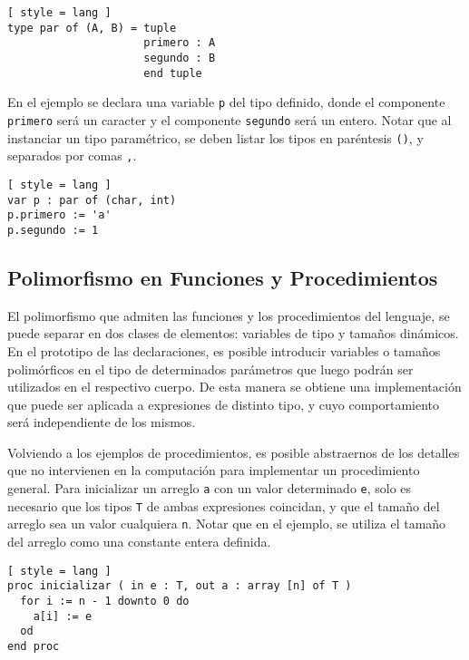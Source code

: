 \begin{lstlisting}[ style = lang ]
type par of (A, B) = tuple
                     primero : A
                     segundo : B
                     end tuple
\end{lstlisting}

En el ejemplo se declara una variable \lstinline[style = lang]{p} del tipo definido, donde el componente \lstinline[style = lang]{primero} será un caracter y el componente \lstinline[style = lang]{segundo} será un entero.
Notar que al instanciar un tipo paramétrico, se deben listar los tipos en paréntesis \lstinline[style = lang]{()}, y separados por comas \lstinline[style = lang]{,}.

\begin{lstlisting}[ style = lang ]
var p : par of (char, int)
p.primero := 'a'
p.segundo := 1
\end{lstlisting}

\subsection{Polimorfismo en Funciones y Procedimientos}

El polimorfismo que admiten las funciones y los procedimientos del lenguaje, se puede separar en dos clases de elementos: variables de tipo y tamaños dinámicos.
En el prototipo de las declaraciones, es posible introducir variables o tamaños polimórficos en el tipo de determinados parámetros que luego podrán ser utilizados en el respectivo cuerpo.
De esta manera se obtiene una implementación que puede ser aplicada a expresiones de distinto tipo, y cuyo comportamiento será independiente de los mismos.

Volviendo a los ejemplos de procedimientos, es posible abstraernos de los detalles que no intervienen en la computación para implementar un procedimiento general.
Para inicializar un arreglo \lstinline[style = lang]{a} con un valor determinado \lstinline[style = lang]{e}, solo es necesario que los tipos \lstinline[style = lang]{T} de ambas expresiones coincidan, y que el tamaño del arreglo sea un valor cualquiera \lstinline[style = lang]{n}.
Notar que en el ejemplo, se utiliza el tamaño del arreglo como una constante entera definida.

\begin{lstlisting}[ style = lang ]
proc inicializar ( in e : T, out a : array [n] of T )
  for i := n - 1 downto 0 do
    a[i] := e
  od
end proc
\end{lstlisting}

